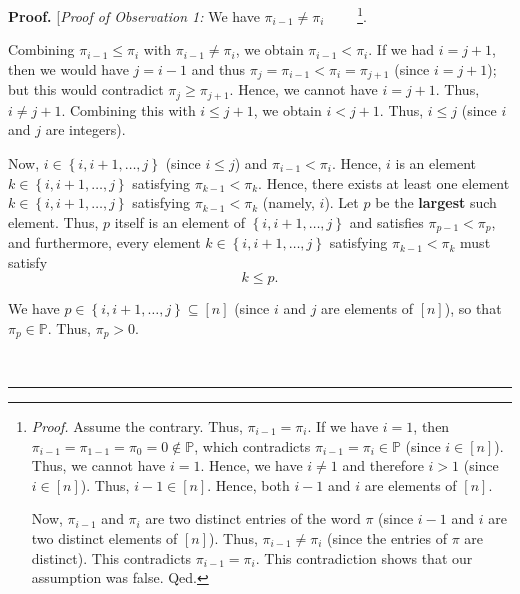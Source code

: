 \documentclass[numbers=enddot,12pt,final,onecolumn,notitlepage]{scrartcl}%
\theoremstyle{definition}
\newenvironment{proof}[1][Proof]{\noindent\textbf{#1.} }{\ \rule{0.5em}{0.5em}}
\newenvironment{verlong}{}{}
\begin{document}
\begin{verlong}
\begin{proof}
[\textit{Proof of Observation 1:} We have $\pi_{i-1}\neq\pi_{i}$%
\ \ \ \ \footnote{\textit{Proof.} Assume the contrary. Thus, $\pi_{i-1}%
=\pi_{i}$. If we have $i=1$, then $\pi_{i-1}=\pi_{1-1}=\pi_{0}=0\notin%
\mathbb{P}$, which contradicts $\pi_{i-1}=\pi_{i}\in\mathbb{P}$ (since
$i\in\left[  n\right]  $). Thus, we cannot have $i=1$. Hence, we have $i\neq1$
and therefore $i>1$ (since $i\in\left[  n\right]  $). Thus, $i-1\in\left[
n\right]  $. Hence, both $i-1$ and $i$ are elements of $\left[  n\right]  $.
\par
Now, $\pi_{i-1}$ and $\pi_{i}$ are two distinct entries of the word $\pi$
(since $i-1$ and $i$ are two distinct elements of $\left[  n\right]  $). Thus,
$\pi_{i-1}\neq\pi_{i}$ (since the entries of $\pi$ are distinct). This
contradicts $\pi_{i-1}=\pi_{i}$. This contradiction shows that our assumption
was false. Qed.}.

Combining $\pi_{i-1}\leq\pi_{i}$ with $\pi_{i-1}\neq\pi_{i}$, we obtain
$\pi_{i-1}<\pi_{i}$. If we had $i=j+1$, then we would have $j=i-1$ and thus
$\pi_{j}=\pi_{i-1}<\pi_{i}=\pi_{j+1}$ (since $i=j+1$); but this would
contradict $\pi_{j}\geq\pi_{j+1}$. Hence, we cannot have $i=j+1$. Thus, $i\neq
j+1$. Combining this with $i\leq j+1$, we obtain $i<j+1$. Thus, $i\leq j$
(since $i$ and $j$ are integers).

Now, $i\in\left\{  i,i+1,\ldots,j\right\}  $ (since $i\leq j$) and $\pi
_{i-1}<\pi_{i}$. Hence, $i$ is an element $k\in\left\{  i,i+1,\ldots
,j\right\}  $ satisfying $\pi_{k-1}<\pi_{k}$. Hence, there exists at least one
element $k\in\left\{  i,i+1,\ldots,j\right\}  $ satisfying $\pi_{k-1}<\pi_{k}$
(namely, $i$). Let $p$ be the \textbf{largest} such element. Thus, $p$ itself
is an element of $\left\{  i,i+1,\ldots,j\right\}  $ and satisfies $\pi
_{p-1}<\pi_{p}$, and furthermore, every element $k\in\left\{  i,i+1,\ldots
,j\right\}  $ satisfying $\pi_{k-1}<\pi_{k}$ must satisfy%
\begin{equation}
k\leq p. \label{pf.lem.Epk.V-sh.o1.pf.max}%
\end{equation}


We have $p\in\left\{  i,i+1,\ldots,j\right\}  \subseteq\left[  n\right]  $
(since $i$ and $j$ are elements of $\left[  n\right]  $), so that $\pi_{p}%
\in\mathbb{P}$. Thus, $\pi_{p}>0$.


\end{proof}
\end{verlong}
\end{document}
